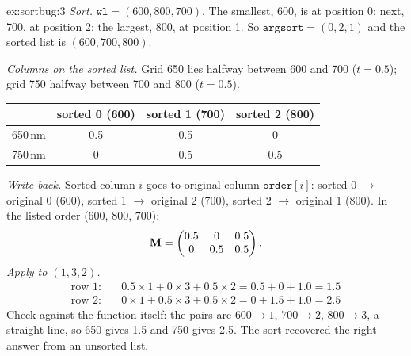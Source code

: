 \begin{solution}{ex:sortbug:3}
\emph{Sort.} $\mathtt{wl} = (600, 800, 700)$. The smallest, 600, is at position 0; next, 700, at position 2; the
largest, 800, at position 1. So $\mathtt{argsort} = (0, 2, 1)$ and the sorted list is $(600, 700, 800)$.

\emph{Columns on the sorted list.} Grid 650 lies halfway between 600 and 700 ($t = 0.5$); grid 750 halfway between
700 and 800 ($t = 0.5$).
\begin{center}
\begin{tabular}{lccc}
\toprule
 & sorted 0 (600) & sorted 1 (700) & sorted 2 (800) \\
\midrule
650\,nm & 0.5 & 0.5 & 0 \\
750\,nm & 0 & 0.5 & 0.5 \\
\bottomrule
\end{tabular}
\end{center}
\emph{Write back.} Sorted column $i$ goes to original column $\mathtt{order}[i]$: sorted 0 $\to$ original 0
(600), sorted 1 $\to$ original 2 (700), sorted 2 $\to$ original 1 (800). In the listed order (600, 800, 700):
\[
\mathbf{M} = \begin{pmatrix} 0.5 & 0 & 0.5 \\ 0 & 0.5 & 0.5 \end{pmatrix}.
\]
\emph{Apply to $(1, 3, 2)$.}
\begin{align*}
\text{row 1:}\quad & 0.5 \times 1 + 0 \times 3 + 0.5 \times 2 = 0.5 + 0 + 1.0 = 1.5\\
\text{row 2:}\quad & 0 \times 1 + 0.5 \times 3 + 0.5 \times 2 = 0 + 1.5 + 1.0 = 2.5
\end{align*}
Check against the function itself: the pairs are $600 \to 1$, $700 \to 2$, $800 \to 3$, a straight line, so 650
gives 1.5 and 750 gives 2.5. The sort recovered the right answer from an unsorted list.
\end{solution}

